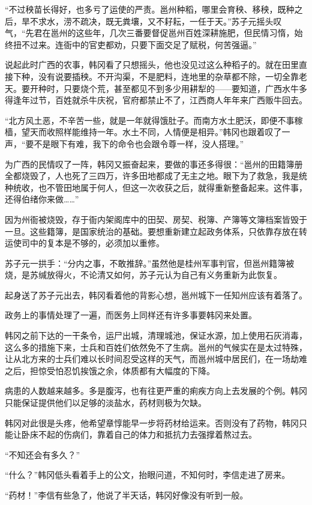 “不过秧苗长得好，也多亏了运使的严责。邕州种稻，哪里会育秧、移秧，既种之后，旱不求水，涝不疏决，既无粪壤，又不耔耘，一任于天。”苏子元摇头叹气，“先君在邕州的这些年，几次三番要督促邕州百姓深耕施肥，但民情习惰，始终扭不过来。连衙中的官吏都劝，只要下面交足了赋税，何苦强逼。”

说起此时广西的农事，韩冈看了只想摇头，他也没见过这么种稻子的。就在田里直接下种，没有说要插秧。不开沟渠，不是肥料，连地里的杂草都不除，一切全靠老天。要开种时，只要烧个荒，甚至都见不到多少用耕犁的——要知道，广西水牛多得逢年过节，百姓就杀牛庆祝，官府都禁止不了，江西商人年年来广西贩牛回去。

“北方风土恶，不辛苦一些，就是一年就得饿肚子。而南方水土肥沃，即便不事稼樯，望天而收照样能维持一年。水土不同，人情便是相异。”韩冈也跟着叹了一声，“要不是眼下有难，我下的命令也会跟令尊一样，没人搭理。”

为广西的民情叹了一阵，韩冈又振奋起来，要做的事还多得很：“邕州的田籍簿册全都烧毁了，人也死了三四万，许多田地都成了无主之地。眼下为了救急，我是统种统收，也不管田地属于何人，但这一次收获之后，就得重新整备起来。这件事，还得伯绪你来做……”

因为州衙被烧毁，存于衙内架阁库中的田契、房契、税簿、产簿等文簿档案皆毁于一旦。这些籍簿，是国家统治的基础。要想重新建立起政务体系，只依靠存放在转运使司中的复本是不够的，必须加以重修。

苏子元一拱手：“分内之事，不敢推辞。”虽然他是桂州军事判官，但邕州籍簿被烧，是苏缄放得火，不论清又如何，苏子元认为自己有义务重新为此恢复。

起身送了苏子元出去，韩冈看着他的背影心想，邕州城下一任知州应该有着落了。

政务上的事情处理了一遍，而医务上同样还有许多事要韩冈来处置。

韩冈之前下达的一干条令，运尸出城，清理城池，保证水源，加上使用石灰消毒，这么多的措施下来，士兵和百姓们依然免不了生病。邕州的气候实在是太过特殊，让从北方来的士兵们难以长时间忍受这样的天气，而邕州城中居民们，在一场劫难之后，担惊受怕忍饥挨饿之余，体质都有大幅度的下降。

病患的人数越来越多。多是腹泻，也有往更严重的痢疾方向上去发展的个例。韩冈只能保证提供他们以足够的淡盐水，药材则极为欠缺。

韩冈对此很是头疼，他希望章惇能早一步将药材给运来。否则没有了药物，韩冈只能让卧床不起的伤病们，靠着自己的体力和抵抗力去强撑着熬过去。

“不知还会有多久？”

“什么？”韩冈低头看着手上的公文，抬眼问道，不知何时，李信走进了房来。

“药材！”李信有些急了，他说了半天话，韩冈好像没有听到一般。

